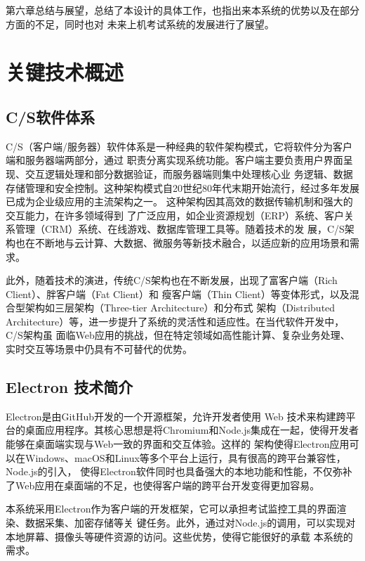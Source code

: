 第六章总结与展望，总结了本设计的具体工作，也指出来本系统的优势以及在部分方面的不足，同时也对
未来上机考试系统的发展进行了展望。


\section{关键技术概述}

\subsection{C/S软件体系}

C/S（客户端/服务器）软件体系是一种经典的软件架构模式，它将软件分为客户端和服务器端两部分，通过
职责分离实现系统功能。客户端主要负责用户界面呈现、交互逻辑处理和部分数据验证，而服务器端则集中处理核心业
务逻辑、数据存储管理和安全控制。这种架构模式自20世纪80年代末期开始流行，经过多年发展已成为企业级应用的主流架构之一。
这种架构因其高效的数据传输机制和强大的交互能力，在许多领域得到
了广泛应用，如企业资源规划（ERP）系统、客户关系管理（CRM）系统、在线游戏、数据库管理工具等。随着技术的发
展，C/S架构也在不断地与云计算、大数据、微服务等新技术融合，以适应新的应用场景和需求。

此外，随着技术的演进，传统C/S架构也在不断发展，出现了富客户端（Rich Client）、胖客户端（Fat Client）和
瘦客户端（Thin Client）等变体形式，以及混合型架构如三层架构（Three-tier Architecture）和分布式
架构（Distributed Architecture）等，进一步提升了系统的灵活性和适应性。在当代软件开发中，C/S架构虽
面临Web应用的挑战，但在特定领域如高性能计算、复杂业务处理、实时交互等场景中仍具有不可替代的优势。


\subsection{Electron 技术简介}

Electron是由GitHub开发的一个开源框架，允许开发者使用 Web 技术来构建跨平
台的桌面应用程序。其核心思想是将Chromium和Node.js集成在一起，使得开发者能够在桌面端实现与Web一致的界面和交互体验。这样的
架构使得Electron应用可以在Windows、macOS和Linux等多个平台上运行，具有很高的跨平台兼容性，Node.js的引入，
使得Electron软件同时也具备强大的本地功能和性能，不仅弥补了Web应用在桌面端的不足，也使得客户端的跨平台开发变得更加容易。

本系统采用Electron作为客户端的开发框架，它可以承担考试监控工具的界面渲染、数据采集、加密存储等关
键任务。此外，通过对Node.js的调用，可以实现对本地屏幕、摄像头等硬件资源的访问。这些优势，使得它能很好的承载
本系统的需求。

